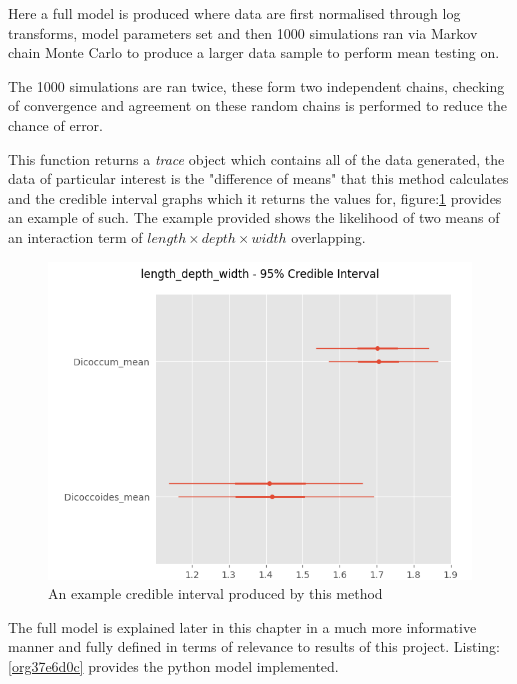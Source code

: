\documentclass[11pt]{report}
\begin{document}
Here a full model is produced where data are first normalised through log transforms, model parameters set and then 1000 simulations ran via Markov chain Monte Carlo to produce a larger data sample to perform mean testing on.

The 1000 simulations are ran twice, these form two independent chains, checking of convergence and agreement on these random chains is performed to reduce the chance of error.

This function returns a \emph{trace} object which contains all of the data generated, the data of particular interest is the "difference of means" that this method calculates and the credible interval graphs which it returns the values for, figure:\ref{fig:org1cb77a2} provides an example of such. The example provided shows the likelihood of two means of an interaction term of
\(length \times  depth \times width\) overlapping.

\begin{figure}[htbp]
\centering
\includegraphics[width=15cm]{./images/ci.png}
\caption{\label{fig:org1cb77a2}
An example credible interval produced by this method}
\end{figure}


The full model is explained later in this chapter in a much more informative manner and fully defined in terms of relevance to results of this project. Listing:\ref{org37e6d0c} provides the python model implemented.
\end{document}

